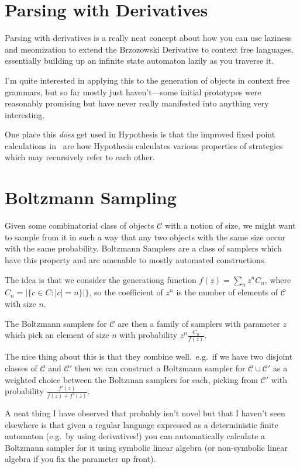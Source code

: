 \documentclass[a4paper]{article}
\begin{document}
\section{Parsing with Derivatives}

Parsing with derivatives\cite{DBLP:conf/icfp/MightDS11, DBLP:conf/pldi/0001HM16} is a really neat concept about how you can use laziness and meomization to extend the Brzozowski Derivative to context free languages,
essentially building up an infinite state automaton lazily as you traverse it.

I'm quite interested in applying this to the generation of objects in context free grammars,
but so far mostly just haven't---some
initial prototypes were reasonably promising but have never really manifested into anything very interesting.

One place this \emph{does} get used in Hypothesis is that the improved fixed point calculations in~\cite{DBLP:conf/pldi/0001HM16} are how Hypothesis calculates various properties of strategies which may recursively refer to each other.

\section{Boltzmann Sampling}

Given some combinatorial class of objects \(\mathcal{C}\) with a notion of size,
we might want to sample from it in such a way that any two objects with the same size occur with the same probability.
Boltzmann Samplers are a class of samplers which have this property and are amenable to mostly automated constructions.

The idea is that we consider the generationg function \(f(z) = \sum\limits_n z^n C_n\),
where \(C_n =  |\{c \in C: |c| = n\}|\}\),
so the coefficient of \(z^n\) is the number of elements of \(\mathcal{C}\) with size \(n\).

The Boltzmann samplers for \(\mathcal{C}\) are then a family of samplers with parameter \(z\) which pick an element of size \(n\) with probability \(z^n \frac{C_n}{f(z)}\).

The nice thing about this is that they combine well.\ 
e.g.\ if we have two disjoint classes of \(\mathcal{C}\) and \(\mathcal{C}'\) then we can construct a Boltzmann sampler for \(\mathcal{C} \cup \mathcal{C}'\) as a weighted choice between the Boltzman samplers for each,
picking from \(\mathcal{C}'\) with probability \(\frac{f'(z)}{f(z) + f'(z)}\).

A neat thing I have observed\cite{falbs} that probably isn't novel but that I haven't seen elsewhere is that given a regular language expressed as a deterministic finite automaton
(e.g.\ by using derivatives!)
you can automatically calculate a Boltzmann sampler for it using symbolic linear algebra
(or non-symbolic linear algebra if you fix the parameter up front).
\end{document}
